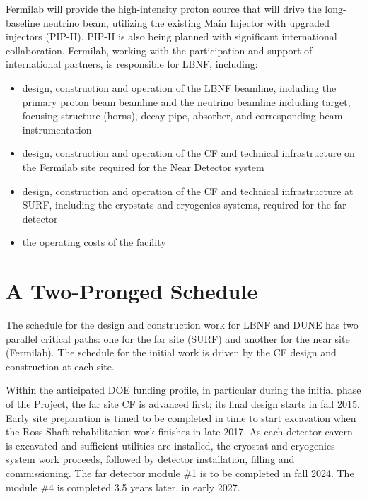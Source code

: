 Fermilab will provide the high-intensity proton source that will drive the long-baseline neutrino beam, utilizing the existing Main Injector with upgraded injectors (PIP-II).  PIP-II is also being planned with significant international collaboration.  Fermilab, working %
with the participation and support of international partners, is responsible for %
LBNF, including:
\begin{itemize}
\item design, construction and operation of the LBNF beamline, including the primary proton beam beamline and the neutrino beamline including target, focusing structure (horns), decay pipe, absorber, and corresponding beam instrumentation
\item design, construction and operation of the CF and technical infrastructure on the Fermilab site required for the Near Detector system
\item design, construction and operation of the CF and technical infrastructure %
at SURF, including the cryostats and cryogenics systems, required for the far detector
\item %
the operating costs of the facility
\end{itemize}


\section{A Two-Pronged Schedule} %

The schedule for the design and construction work for LBNF and DUNE has two parallel critical paths: one for the %
far site (SURF) and %
another for the %
near site (Fermilab). The schedule for the initial work is driven by the CF design and construction at each site. 

Within the anticipated DOE funding profile, in particular during the initial phase of the Project, the far site CF is advanced first; its final design starts in fall 2015. Early site preparation is timed to be completed %
in time to start excavation when the Ross Shaft rehabilitation work finishes %
 in late 2017. As each detector %
 cavern is excavated and sufficient utilities are installed, the cryostat and cryogenics system work proceeds, followed by detector installation, filling and commissioning. The far detector module \#1 is to be completed in fall 2024. The module \#4 is completed 3.5 years later, in early 2027. 

